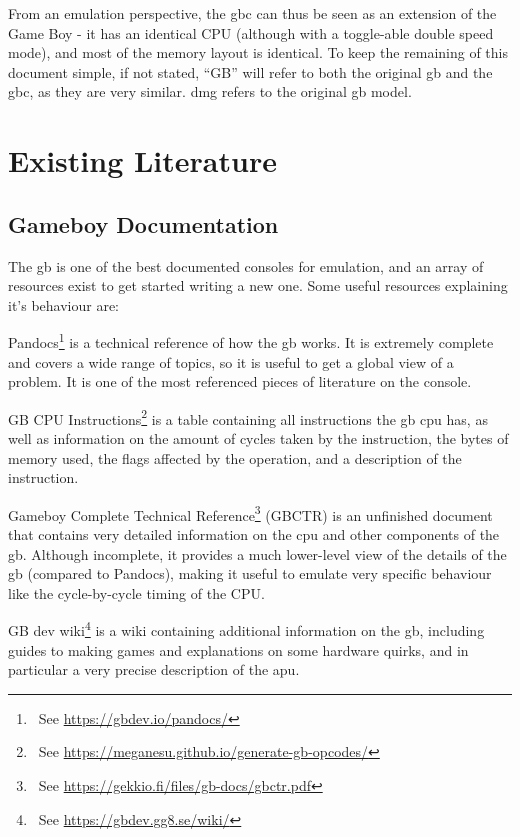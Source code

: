 \documentclass[11pt]{report}
\newcommand{\ftnt}[1]{\footnote{~See \url{#1}}}
\begin{document}
From an emulation perspective, the \glsdesc{gbc} can thus be seen as an extension of the Game Boy - it has an identical CPU (although with a toggle-able double speed mode), and most of the memory layout is identical. To keep the remaining of this document simple, if not stated, ``GB'' will refer to both the original \glsdesc{gb} and the \glsdesc{gbc}, as they are very similar. \gls{dmg} refers to the original \glsdesc{gb} model.

\section{Existing Literature}

\subsection{Gameboy Documentation}

The \glsdesc{gb} is one of the best documented consoles for emulation, and an array of resources exist to get started writing a new one. Some useful resources explaining it's behaviour are:

\begin{compactitem}
    \item Pandocs\ftnt{https://gbdev.io/pandocs/} is a technical reference of how the \gls{gb} works. It is extremely complete and covers a wide range of topics, so it is useful to get a global view of a problem. It is one of the most referenced pieces of literature on the console.
    \item GB CPU Instructions\ftnt{https://meganesu.github.io/generate-gb-opcodes/} is a table containing all instructions the \gls{gb} \gls{cpu} has, as well as information on the amount of cycles taken by the instruction, the bytes of memory used, the flags affected by the operation, and a description of the instruction.
    \item Gameboy Complete Technical Reference\ftnt{https://gekkio.fi/files/gb-docs/gbctr.pdf} (GBCTR) is an unfinished document that contains very detailed information on the \gls{cpu} and other components of the \gls{gb}. Although incomplete, it provides a much lower-level view of the details of the \gls{gb} (compared to Pandocs), making it useful to emulate very specific behaviour like the cycle-by-cycle timing of the CPU.
    \item GB dev wiki\ftnt{https://gbdev.gg8.se/wiki/} is a wiki containing additional information on the \gls{gb}, including guides to making games and explanations on some hardware quirks, and in particular a very precise description of the \gls{apu}.
\end{compactitem}
\end{document}

